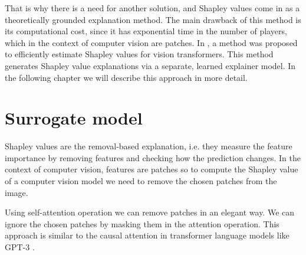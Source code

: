 \documentclass[magisterska,en]{pracamgr}
\begin{document}
That is why there is a need for another solution, and Shapley values come in as a theoretically grounded explanation method. The main drawback of this method is its computational cost, since it has exponential time in the number of players, which in the context of computer vision are patches. In \cite{DBLP:conf/iclr/Covert0L23}, a method was proposed to efficiently estimate Shapley values for vision transformers. This method generates Shapley value explanations via a separate, learned explainer model. In the following chapter we will describe this approach in more detail.



\section{Surrogate model}\label{s:surrogate}
Shapley values are the removal-based explanation, i.e. they measure the feature importance by removing features and checking how the prediction changes. In the context of computer vision, features are patches so to compute the Shapley value of a computer vision model we need to remove the chosen patches from the image.

Using self-attention operation we can remove patches in an elegant way. We can ignore the chosen patches by masking them in the attention operation. This approach is similar to the causal attention in transformer language models like GPT-3 \cite{DBLP:conf/nips/BrownMRSKDNSSAA20}.
\end{document}
